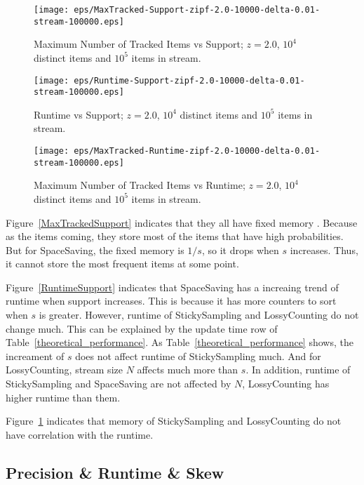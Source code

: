 \documentclass[10pt]{article}
\begin{document}
\begin{figure}[H]
      \begin{minipage}{0.48\textwidth}
        \centering
        \texttt{[image: eps/MaxTracked-Support-zipf-2.0-10000-delta-0.01-stream-100000.eps]}
        \caption{Maximum Number of Tracked Items vs Support; $z=2.0$, $10^4$ distinct items and $10^5$ items in stream.}
        \label{MaxTrackedSupport}
      \end{minipage}\hfill
      \begin{minipage}{0.48\textwidth}
        \centering
        \texttt{[image: eps/Runtime-Support-zipf-2.0-10000-delta-0.01-stream-100000.eps]}
        \caption{Runtime vs Support; $z=2.0$, $10^4$ distinct items and $10^5$ items in stream.}
        \label{RuntimeSupport}
      \end{minipage}
      \centering
      \begin{minipage}{0.48\textwidth}
        \centering
        \texttt{[image: eps/MaxTracked-Runtime-zipf-2.0-10000-delta-0.01-stream-100000.eps]}
        \caption{Maximum Number of Tracked Items vs Runtime; $z=2.0$, $10^4$ distinct items and $10^5$ items in stream.}
        \label{MaxTrackedRuntime}
      \end{minipage}
\end{figure}
 Figure~\ref{MaxTrackedSupport} indicates that they all have fixed memory .
 Because as the items coming, they store most of the items that have high probabilities.
But for SpaceSaving, the fixed memory is $1/s$, so it drops when $s$ increases. 
Thus, it cannot store the most frequent items at some point. 

Figure~\ref{RuntimeSupport} indicates that SpaceSaving has a increaing trend of runtime when
support increases. This is because it has more counters to sort when $s$ is greater.
However, runtime of StickySampling and LossyCounting do not change much.
This can be explained by the update time row of Table~\ref{theoretical_performance}.
As Table~\ref{theoretical_performance} shows, the increament of $s$ does not 
affect runtime of StickySampling much. And for LossyCounting, stream size $N$
affects much more than $s$. In addition, runtime of StickySampling and SpaceSaving are not affected by $N$, 
LossyCounting has higher runtime than them.

Figure~\ref{MaxTrackedRuntime} indicates that memory of StickySampling and LossyCounting
do not have correlation with the runtime. 

\subsection{Precision \& Runtime \& Skew}
\end{document}
